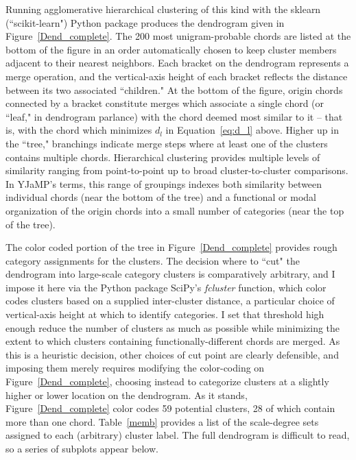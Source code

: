 Running agglomerative hierarchical clustering of this kind with the sklearn (``scikit-learn") Python package produces the dendrogram given in Figure~\ref{Dend_complete}.  The 200 most unigram-probable chords are listed at the bottom of the figure in an order automatically chosen to keep cluster members adjacent to their nearest neighbors.  Each bracket on the dendrogram represents a merge operation, and the vertical-axis height of each bracket reflects the distance between its two associated ``children."  At the bottom of the figure, origin chords connected by a bracket constitute merges which associate a single chord (or ``leaf," in dendrogram parlance) with the chord deemed most similar to it -- that is, with the chord which minimizes $d_l$ in Equation~\ref{eq:d_l} above.  Higher up in the ``tree," branchings indicate merge steps where at least one of the clusters contains multiple chords.  Hierarchical clustering provides multiple levels of similarity ranging from point-to-point up to broad cluster-to-cluster comparisons.  In YJaMP's terms, this range of groupings indexes both similarity between individual chords (near the bottom of the tree) and a functional or modal organization of the origin chords into a small number of categories (near the top of the tree).

The color coded portion of the tree in Figure~\ref{Dend_complete} provides rough category assignments for the clusters.  The decision where to ``cut" the dendrogram into large-scale category clusters is comparatively arbitrary, and I impose it here via the Python package SciPy's \emph{fcluster} function, which color codes clusters based on a supplied inter-cluster distance, a particular choice of vertical-axis height at which to identify categories.  I set that threshold high enough reduce the number of clusters as much as possible while minimizing the extent to which clusters containing functionally-different chords are merged.  As this is a heuristic decision, other choices of cut point are clearly defensible, and imposing them merely requires modifying the color-coding on Figure~\ref{Dend_complete}, choosing instead to categorize clusters at a slightly higher or lower location on the dendrogram.  As it stands, Figure~\ref{Dend_complete} color codes 59 potential clusters, 28 of which contain more than one chord.  Table~\ref{memb} provides a list of the scale-degree sets assigned to each (arbitrary) cluster label.  The full dendrogram is difficult to read, so a series of subplots appear below.

